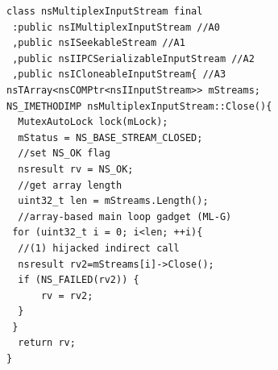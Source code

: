 % 

\newsavebox{\firstlisting}
\begin{lrbox}{\firstlisting}
\begin{minipage}[c]{\linewidth}
\begin{verbatim}
class nsMultiplexInputStream final 
 :public nsIMultiplexInputStream //A0
 ,public nsISeekableStream //A1
 ,public nsIIPCSerializableInputStream //A2
 ,public nsICloneableInputStream{ //A3
nsTArray<nsCOMPtr<nsIInputStream>> mStreams;
NS_IMETHODIMP nsMultiplexInputStream::Close(){
  MutexAutoLock lock(mLock);
  mStatus = NS_BASE_STREAM_CLOSED;
  //set NS_OK flag
  nsresult rv = NS_OK;
  //get array length
  uint32_t len = mStreams.Length();
  //array-based main loop gadget (ML-G)
 for (uint32_t i = 0; i<len; ++i){
  //(1) hijacked indirect call
  nsresult rv2=mStreams[i]->Close();
  if (NS_FAILED(rv2)) {
      rv = rv2;
  }
 }
  return rv;
}
\end{verbatim}
\end{minipage}
\end{lrbox}

